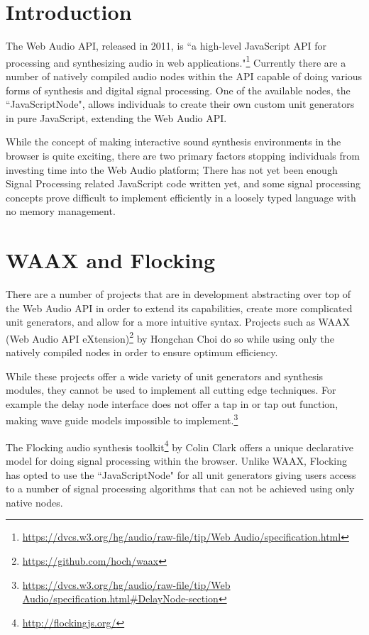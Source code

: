 \documentclass[runningheads,a4paper]{llncs}
\begin{document}
\section{Introduction}

The Web Audio API, released in 2011, is ``a high-level JavaScript API for processing and synthesizing audio in web applications."\footnote{\url{https://dvcs.w3.org/hg/audio/raw-file/tip/Web Audio/specification.html}}  Currently there are a number of natively compiled audio nodes within the API capable of doing various forms of synthesis and digital signal processing. One of the available nodes, the ``JavaScriptNode", allows individuals to create their own custom unit generators in pure JavaScript, extending the Web Audio API.

While the concept of making interactive sound synthesis environments in the browser is quite exciting, there are two primary factors stopping individuals from investing time into the Web Audio platform; There has not yet been enough Signal Processing related JavaScript code written yet, and some signal processing concepts prove difficult to implement efficiently in a loosely typed language with no memory management.

\section{WAAX and Flocking}

There are a number of projects that are in development abstracting over top of the Web Audio API in order to extend its capabilities, create more complicated unit generators, and allow for a more intuitive syntax.  Projects such as WAAX (Web Audio API eXtension)\footnote{\url{https://github.com/hoch/waax}} by Hongchan Choi do so while using only the natively compiled nodes in order to ensure optimum efficiency.\cite{waax}

While these projects offer a wide variety of unit generators and synthesis modules, they cannot be used to implement all cutting edge techniques.  For example the delay node interface does not offer a tap in or tap out function, making wave guide models impossible to implement.\footnote{\url{https://dvcs.w3.org/hg/audio/raw-file/tip/Web Audio/specification.html#DelayNode-section}}

The Flocking audio synthesis toolkit\footnote{\url{http://flockingjs.org/}} by Colin Clark offers a unique declarative model for doing signal processing within the browser.  Unlike WAAX, Flocking has opted to use the ``JavaScriptNode" for all unit generators giving users access to a number of signal processing algorithms that can not be achieved using only native nodes.
\end{document}
